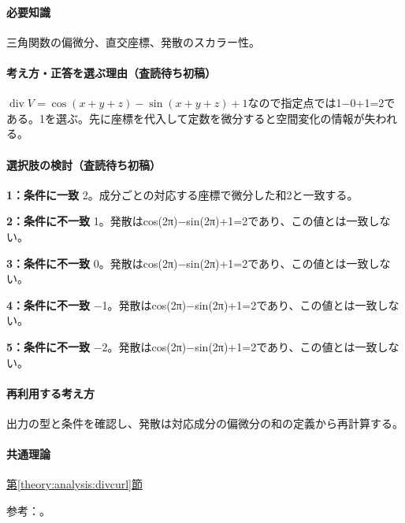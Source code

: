 \paragraph{必要知識} 三角関数の偏微分、直交座標、発散のスカラー性。

\paragraph{考え方・正答を選ぶ理由（査読待ち初稿）} \(\operatorname{div}V=\cos(x+y+z)-\sin(x+y+z)+1\)なので指定点では1−0+1=\allowbreak{}2である。1を選ぶ。先に座標を代入して定数を微分すると空間変化の情報が失われる。

\paragraph{選択肢の検討（査読待ち初稿）}\mbox{}\par

\noindent\textbf{1：条件に一致} 2。成分ごとの対応する座標で微分した和2と一致する。\par

\noindent\textbf{2：条件に不一致} 1。発散はcos(2π)−sin(2π)+1=\allowbreak{}2であり、この値とは一致しない。\par

\noindent\textbf{3：条件に不一致} 0。発散はcos(2π)−sin(2π)+1=\allowbreak{}2であり、この値とは一致しない。\par

\noindent\textbf{4：条件に不一致} −1。発散はcos(2π)−sin(2π)+1=\allowbreak{}2であり、この値とは一致しない。\par

\noindent\textbf{5：条件に不一致} −2。発散はcos(2π)−sin(2π)+1=\allowbreak{}2であり、この値とは一致しない。\par

\paragraph{再利用する考え方} 出力の型と条件を確認し、発散は対応成分の偏微分の和の定義から再計算する。

\paragraph{共通理論} \hyperref[theory:analysis:divcurl]{第\ref*{theory:analysis:divcurl}節}

\par 参考：\cite{mit_vectorcalc2005}。

